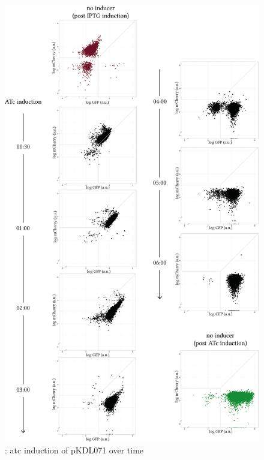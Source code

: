 \begin{figure}[tb]
	\begin{center}
\includegraphics[scale=0.7]{../../chapters/chapterABCFlow/images/pKDL071_atc_time.png}
\caption[LoF caption]{\label{fig:switch_timecourse_atc}: \acrshort{atc} induction of pKDL071 over time}
\end{center}
\end{figure}


